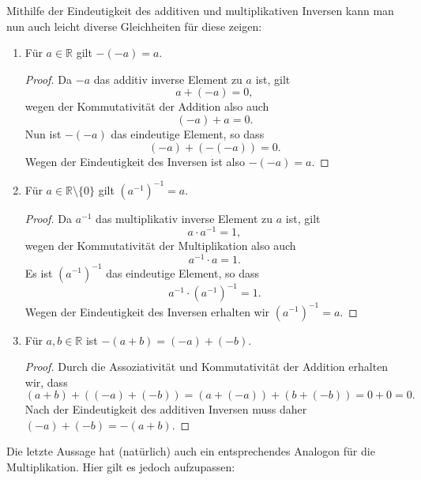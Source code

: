\documentclass[a4paper,10pt]{article}
\newcommand{\R}{\mathbb{R}}
\begin{document}
 Mithilfe der Eindeutigkeit des additiven und multiplikativen Inversen kann man nun auch leicht diverse Gleichheiten für diese zeigen:
 
 \begin{enumerate}[resume]
  \item
   Für $a \in \R$ gilt $-(-a) = a$.
   \begin{proof}
    Da $-a$ das additiv inverse Element zu $a$ ist, gilt
    \[
     a + (-a) = 0,
    \]
    wegen der Kommutativität der Addition also auch
    \[
     (-a) + a = 0.
    \]
    Nun ist $-(-a)$ das eindeutige Element, so dass
    \[
     (-a) + (-(-a)) = 0.
    \]
    Wegen der Eindeutigkeit des Inversen ist also $-(-a) = a$.
   \end{proof}
  \item
   Für $a \in \R \setminus \{0\}$ gilt $(a^{-1})^{-1} = a$.
   \begin{proof}
    Da $a^{-1}$ das multiplikativ inverse Element zu $a$ ist, gilt
    \[
     a \cdot a^{-1} = 1,
    \]
    wegen der Kommutativität der Multiplikation also auch
    \[
     a^{-1} \cdot a = 1.
    \]
    Es ist $(a^{-1})^{-1}$ das eindeutige Element, so dass
    \[
     a^{-1} \cdot \left(a^{-1}\right)^{-1} = 1.
    \]
    Wegen der Eindeutigkeit des Inversen erhalten wir $(a^{-1})^{-1} = a$.
   \end{proof}
  \item
   Für $a, b \in \R$ ist $-(a + b) = (-a) + (-b)$.
   \begin{proof}
    Durch die Assoziativität und Kommutativität der Addition erhalten wir, dass
    \[
     (a+b) + ((-a) + (-b)) = (a + (-a)) + (b + (-b)) = 0 + 0 = 0.
    \]
    Nach der Eindeutigkeit des additiven Inversen muss daher $(-a) + (-b) = -(a + b)$.
   \end{proof}
 \end{enumerate}
 Die letzte Aussage hat (natürlich) auch ein entsprechendes Analogon für die Multiplikation. Hier gilt es jedoch aufzupassen:
\end{document}
